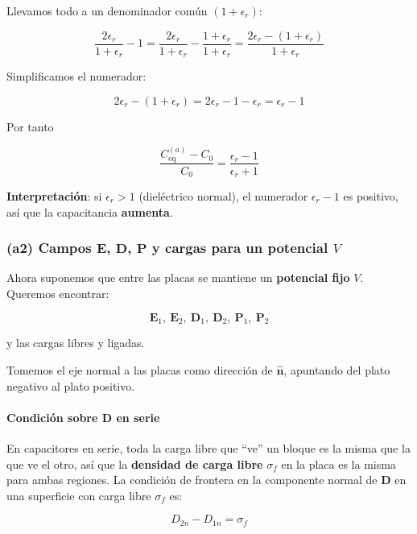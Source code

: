 \documentclass{article}
\begin{document}
Llevamos todo a un denominador común $(1+\epsilon_{r})$:

\[
\frac{2\epsilon_{r}}{1+\epsilon_{r}} - 1
= \frac{2\epsilon_{r}}{1+\epsilon_{r}} - \frac{1+\epsilon_{r}}{1+\epsilon_{r}}
= \frac{2\epsilon_{r} - (1+\epsilon_{r})}{1+\epsilon_{r}}
\]

Simplificamos el numerador:

\[
2\epsilon_{r} - (1+\epsilon_{r}) = 2\epsilon_{r} - 1 - \epsilon_{r} = \epsilon_{r} - 1
\]

Por tanto

\begin{equation}
\frac{C_{\text{eq}}^{(a)} - C_{0}}{C_{0}}
= \frac{\epsilon_{r}-1}{\epsilon_{r}+1}
\label{eq:incremento-a}
\end{equation}

\textbf{Interpretación}: si $\epsilon_{r} > 1$ (dieléctrico normal), el numerador $\epsilon_{r}-1$ es positivo, así que la capacitancia \textbf{aumenta}.

\subsubsection*{(a2) Campos $\mathbf{E}$, $\mathbf{D}$, $\mathbf{P}$ y cargas para un potencial $V$}

Ahora suponemos que entre las placas se mantiene un \textbf{potencial fijo} $V$. Queremos encontrar:

\[
\mathbf{E}_{1},\ \mathbf{E}_{2},\ 
\mathbf{D}_{1},\ \mathbf{D}_{2},\ 
\mathbf{P}_{1},\ \mathbf{P}_{2}
\]

y las cargas libres y ligadas.

Tomemos el eje normal a las placas como dirección de $\hat{\mathbf{n}}$, apuntando del plato negativo al plato positivo.

\paragraph{Condición sobre $\mathbf{D}$ en serie}

En capacitores en serie, toda la carga libre que “ve” un bloque es la misma que la que ve el otro, así que la \textbf{densidad de carga libre} $\sigma_{f}$ en la placa es la misma para ambas regiones.  
La condición de frontera en la componente normal de $\mathbf{D}$ en una superficie con carga libre $\sigma_{f}$ es:

\[
D_{2n} - D_{1n} = \sigma_{f}
\]
\end{document}
